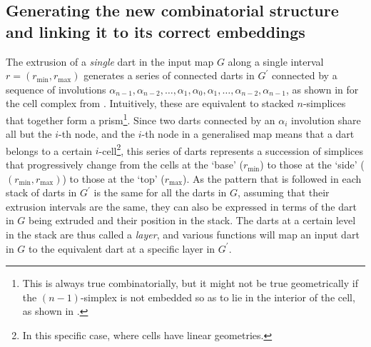 \subsection{Generating the new combinatorial structure and linking it to its correct embeddings}
\label{ss:combinatorial}

The extrusion of a \emph{single} dart in the input map $G$ along a single interval $r = (r_{\min}, r_{\max})$ generates a series of connected darts in $G^\prime$ connected by a sequence of involutions $\alpha_{n-1}, \alpha_{n-2}, \ldots, \alpha_{1}, \alpha_{0}, \alpha_{1}, \ldots, \alpha_{n-2}, \alpha_{n-1}$, as shown in  for the cell complex from .
Intuitively, these are equivalent to stacked $n$-simplices that together form a prism\footnote{This is always true combinatorially, but it might not be true geometrically if the $(n-1)$-simplex is not embedded so as to lie in the interior of the cell, as shown in .}.
Since two darts connected by an $\alpha_i$ involution share all but the $i$-th node, and the $i$-th node in a generalised map means that a dart belongs to a certain $i$-cell\footnote{In this specific case, where cells have linear geometries.}, this series of darts represents a succession of simplices that progressively change from the cells at the `base' ($r_{\min}$) to those at the `side' ($(r_{\min}, r_{\max})$) to those at the `top' ($r_{\max}$).
As the pattern that is followed in each stack of darts in $G^\prime$ is the same for all the darts in $G$, assuming that their extrusion intervals are the same, they can also be expressed in terms of the dart in $G$ being extruded and their position in the stack.
The darts at a certain level in the stack are thus called a \emph{layer}, and various functions will map an input dart in $G$ to the equivalent dart at a specific layer in $G^\prime$.
